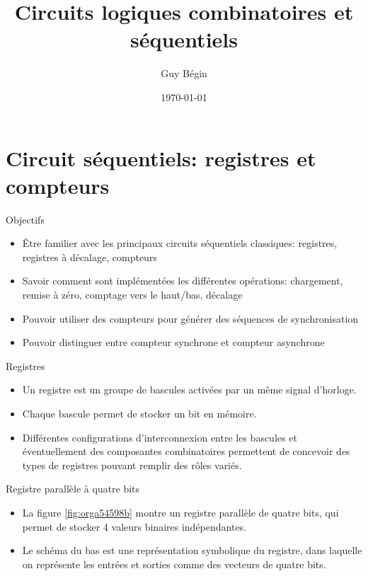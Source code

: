 \documentclass[presentation]{beamer}
\author{Guy Bégin}
\date{\today}
\title{Circuits logiques combinatoires et séquentiels}
\begin{document}
\maketitle

\section{Circuit séquentiels: registres et compteurs}
\label{sec:orga51153f}
\begin{frame}[label={sec:orgc17f33f}]{Objectifs}
\begin{itemize}
\item Être familier avec les principaux circuits séquentiels classiques:
registres, registres à décalage, compteurs
\item Savoir comment sont implémentées les différentes opérations:
chargement, remise à zéro, comptage vers le haut/bas, décalage
\item Pouvoir utiliser des compteurs pour générer des séquences de
synchronisation
\item Pouvoir distinguer entre compteur synchrone et compteur asynchrone
\end{itemize}
\end{frame}

\begin{frame}[label={sec:org141f579}]{Registres}
\begin{itemize}
\item Un registre est un groupe de bascules activées par un même signal d'horloge.

\item Chaque bascule permet de stocker un bit en mémoire.

\item Différentes configurations d'interconnexion entre les bascules et éventuellement des composantes combinatoires permettent de concevoir des types de registres pouvant remplir des rôles variés.
\end{itemize}
\end{frame}

\begin{frame}[label={sec:org7129d13}]{Registre parallèle à quatre bits}
\begin{itemize}
\item La figure \ref{fig:orga54598b} montre un registre parallèle de quatre bits, qui permet de stocker 4 valeurs binaires indépendantes.

\item Le schéma du bas est une représentation symbolique du registre, dans laquelle on représente les entrées et sorties comme des vecteurs de quatre bits.
\end{itemize}
\end{frame}
\end{document}
